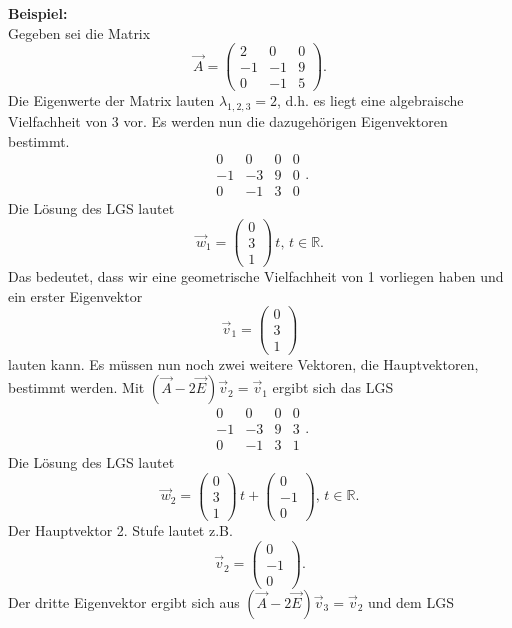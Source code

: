 \noindent
\textbf{Beispiel:}\\
Gegeben sei die Matrix
$$
\vec A = \begin{pmatrix}
2 & 0 & 0 \\
-1 & -1 & 9 \\
0 & -1 & 5 
\end{pmatrix}.
$$
\noindent
Die Eigenwerte der Matrix lauten $\lambda_{1,2,3} = 2$, d.h. es liegt eine algebraische Vielfachheit von 3 vor.
Es werden nun die dazugeh\"origen Eigenvektoren bestimmt.
$$
\begin{array}{rrr|l}
0 & 0 & 0 & 0 \\
-1 & -3 & 9 & 0 \\
0 & -1 & 3 & 0 
\end{array}.
$$
Die L\"osung des LGS lautet
$$
\vec w_1 = \begin{pmatrix} 0 \\ 3 \\ 1 \end{pmatrix} \, t,\, t \in \mathbb{R}.
$$
Das bedeutet, dass wir eine geometrische Vielfachheit von 1 vorliegen haben und ein erster Eigenvektor
$$
\vec v_1 = \begin{pmatrix} 0 \\ 3 \\ 1 \end{pmatrix}
$$
lauten kann. Es m\"ussen nun noch zwei weitere Vektoren, die Hauptvektoren, bestimmt werden.
Mit $(\vec A - 2 \vec E) \vec v_2 = \vec v_{1}$ ergibt sich das LGS
$$
\begin{array}{rrr|l}
0 & 0 & 0 & 0 \\
-1 & -3 & 9 & 3 \\
0 & -1 & 3 & 1 
\end{array}.
$$
Die L\"osung des LGS lautet
$$
\vec w_2 = \begin{pmatrix} 0 \\ 3 \\ 1 \end{pmatrix} \, t + \begin{pmatrix} 0 \\ -1 \\ 0 \end{pmatrix} ,\, t \in \mathbb{R}.
$$
Der Hauptvektor 2. Stufe lautet z.B.
$$
\vec v_2 = \begin{pmatrix} 0 \\ -1 \\ 0 \end{pmatrix}.
$$
Der dritte Eigenvektor ergibt sich aus $(\vec A - 2 \vec E) \vec v_3 = \vec v_{2}$  und dem LGS
